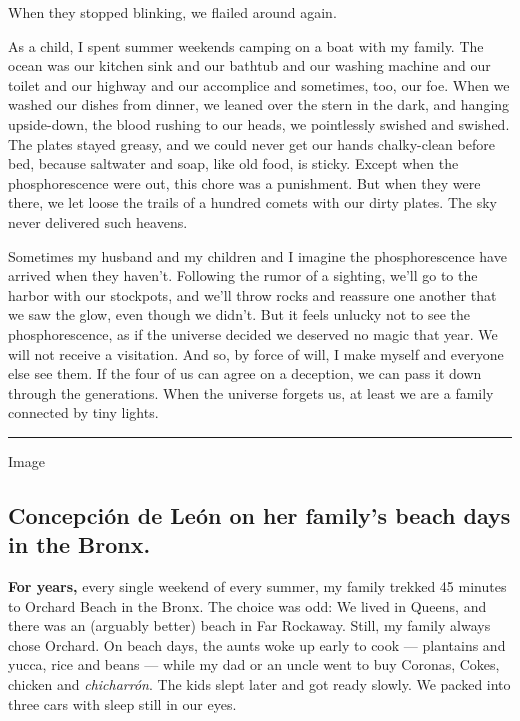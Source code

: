 When they stopped blinking, we flailed around again.

As a child, I spent summer weekends camping on a boat with my family.
The ocean was our kitchen sink and our bathtub and our washing machine
and our toilet and our highway and our accomplice and sometimes, too,
our foe. When we washed our dishes from dinner, we leaned over the stern
in the dark, and hanging upside-down, the blood rushing to our heads, we
pointlessly swished and swished. The plates stayed greasy, and we could
never get our hands chalky-clean before bed, because saltwater and soap,
like old food, is sticky. Except when the phosphorescence were out, this
chore was a punishment. But when they were there, we let loose the
trails of a hundred comets with our dirty plates. The sky never
delivered such heavens.

Sometimes my husband and my children and I imagine the phosphorescence
have arrived when they haven't. Following the rumor of a sighting, we'll
go to the harbor with our stockpots, and we'll throw rocks and reassure
one another that we saw the glow, even though we didn't. But it feels
unlucky not to see the phosphorescence, as if the universe decided we
deserved no magic that year. We will not receive a visitation. And so,
by force of will, I make myself and everyone else see them. If the four
of us can agree on a deception, we can pass it down through the
generations. When the universe forgets us, at least we are a family
connected by tiny lights.

\begin{center}\rule{0.5\linewidth}{\linethickness}\end{center}

Image

\hypertarget{concepciuxf3n-de-leuxf3n-on-her-familys-beach-days-in-the-bronx}{%
\subsection{Concepción de León on her family's beach days in the
Bronx.}\label{concepciuxf3n-de-leuxf3n-on-her-familys-beach-days-in-the-bronx}}

\textbf{For years,} every single weekend of every summer, my family
trekked 45 minutes to Orchard Beach in the Bronx. The choice was odd: We
lived in Queens, and there was an (arguably better) beach in Far
Rockaway. Still, my family always chose Orchard. On beach days, the
aunts woke up early to cook --- plantains and yucca, rice and beans ---
while my dad or an uncle went to buy Coronas, Cokes, chicken and
\emph{chicharrón}. The kids slept later and got ready slowly. We packed
into three cars with sleep still in our eyes.

